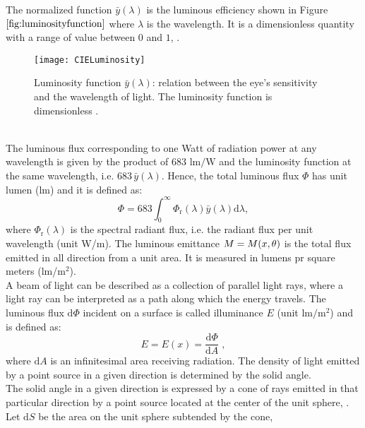   The normalized function $\bar{y}(\lambda)$ is the luminous efficiency shown in Figure $\ref{fig:luminosityfunction}$ where $\lambda$ is the wavelength. It is a dimensionless quantity with a range of value between $0$ and $1$, \cite{schubert2005light}.
\begin{figure}[h]
  \begin{center}
  \texttt{[image: CIELuminosity]}
  \end{center}
  \caption{Luminosity function $\bar{y}(\lambda)$: relation between the eye's sensitivity and the wavelength of light. The luminosity function is dimensionless  \cite{wiki}.}
  \label{fig:luminosityfunction}
  \end{figure}
\\ \indent The luminous flux corresponding to one Watt of radiation power at any wavelength is given by the product of $683$ $\textrm{lm/W}$ and the luminosity function at the same wavelength,
i.e. $683 \, \bar{y}(\lambda)$. Hence, the total luminous flux $\Phi$ has unit lumen (\textrm{lm}) and it is defined as:
\begin{equation}
\Phi = 683 \int_0^\infty \Phi_\textrm{r}(\lambda) \bar{y}(\lambda)\textrm{d}\lambda,
\end{equation}
where $\Phi_\textrm{r}(\lambda)$ is the spectral radiant flux, i.e. the radiant flux per unit wavelength (unit \textrm{W}/\textrm{m}). 
The luminous emittance $M = M(x, \theta)$ is the total flux emitted in all direction from a unit area. It is measured in lumens pr square meters (\textrm{lm}/$\textrm{m}^2$).
\\ \indent A beam of light can be described as a collection of parallel light rays, where a light ray can be interpreted as a path along which the energy travels. 
The luminous flux $\textrm{d}\Phi$ incident on a surface is called illuminance $E$ (unit $\textrm{lm}/\textrm{m}^2$)
and is defined as:
\begin{equation}
 E=E(x) = \frac{\textrm{d}\Phi}{\textrm{d}A}\;,
 \end{equation}
 where $\textrm{d}A$ is an infinitesimal area receiving radiation. The density of light emitted by a point source in a given direction is determined by the solid angle.\\ \indent
The solid angle in a given direction is expressed by a cone of rays emitted in that particular direction by a point source located at the center of the unit sphere, \cite{koshel2012illumination}. 
Let $\textrm{d}S$ be the area on the unit sphere subtended by the cone,
